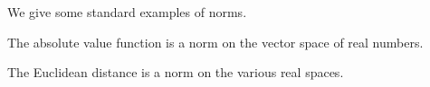 

We give some standard examples
of norms.


\begin{expl}
  The absolute value
  function is a norm
  on the vector space
  of real numbers.
\end{expl}

\begin{expl}
  The Euclidean distance
  is a norm on the various
  real spaces.
\end{expl}
